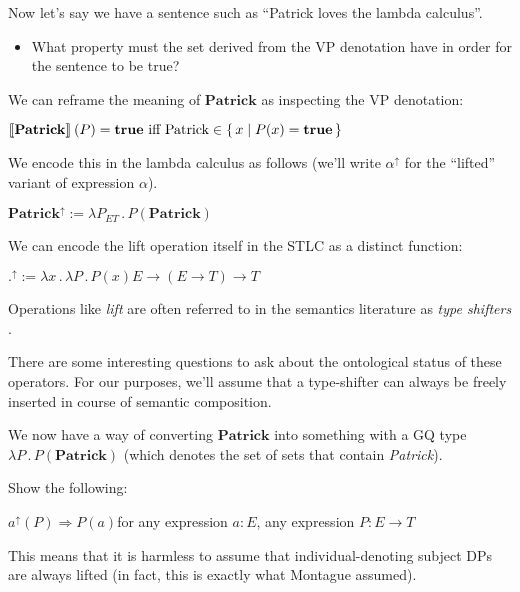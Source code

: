 \documentclass[letterpaper,parskip=half]{scrartcl}
\begin{document}
Now let's say we have a sentence such as ``Patrick loves the lambda calculus''.

\begin{itemize}
\item What property must the set derived from the VP denotation have in order for the sentence to be true?
\end{itemize}

We can reframe the meaning of \(\mathbf{Patrick}\) as inspecting the VP denotation:

\begin{exe}
\ex \(\eval*{\mathbf{Patrick}}(P) = \mathbf{true} \text{ iff } \text{Patrick} \in \set{x | P(x) = \mathbf{true}}\)
\label{orgea3c67d}
\end{exe}

We encode this in the lambda calculus as follows (we'll write \(\alpha^\uparrow\) for the ``lifted'' variant of expression \(\alpha\)).

\begin{exe}
\ex \(\mathbf{Patrick}^\uparrow := \lambda P_{ET}\,.\,P(\mathbf{Patrick})\)
\label{orgb1d0a0a}
\end{exe}

We can encode the lift operation itself in the STLC as a distinct function:

\begin{exe}
\ex \(.^{\uparrow} := \lambda x\,.\,\lambda P\,.\,P(x)\)\hfill\(E \to (E \to T) \to T\)
\label{org78812ee}
\end{exe}

Operations like \emph{lift} are often referred to in the semantics literature as \emph{type shifters} \autocite{Partee1986}.

There are some interesting questions to ask about the ontological status of these operators. For our purposes, we'll assume that a type-shifter can always be freely inserted in course of semantic composition.

We now have a way of converting \(\mathbf{Patrick}\) into something with a GQ type \(\lambda P\,.\,P(\mathbf{Patrick})\) (which denotes the set of sets that contain \emph{Patrick}).

Show the following:

\begin{exe}
\ex \(a^\uparrow(P) \Rightarrow P(a)\)\hfill for any expression \(a: E\), any expression \(P:E \to T\)
\label{orga5e7ab2}
\end{exe}

This means that it is harmless to assume that individual-denoting subject DPs are always lifted (in fact, this is exactly what Montague assumed).
\end{document}
